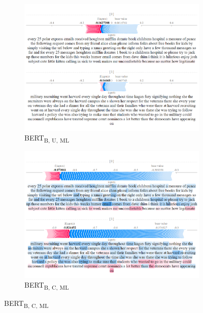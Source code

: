 \begin{figure}[!ht]

    \begin{subfigure}[t]{0.4\textwidth}
        \includegraphics[width=\textwidth]{figs/one_TF/bert-b-ml-u.png}
        \caption{{BERT}\textsubscript{B, U, ML}}
    \end{subfigure}
    \hspace{\fill} %
    \begin{subfigure}[t]{0.4\textwidth}
        \includegraphics[width=\linewidth]{figs/one_TF/bert-b-ml-c.png}
        \caption{{BERT}\textsubscript{B, C, ML}}
    \end{subfigure}



\end{figure}
